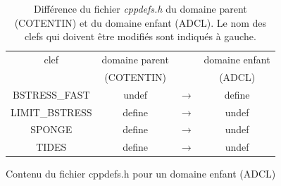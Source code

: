 \documentclass[10pt,a4paper,titlepage]{article}
\begin{document}
\begin{table}[h!]
    \centering
    \caption{
        Différence du fichier \textit{cppdefs.h} du domaine parent (COTENTIN) et du domaine enfant (ADCL).
        Le nom des clefs qui doivent être modifiés sont indiqués à gauche.
    }
    \begin{tabular}{c | c c c}
        clef & domaine parent & & domaine enfant  \\
         & (COTENTIN) & & (ADCL) \\
        \hline
        BSTRESS\_FAST & {\color{red}undef} & $\rightarrow$ & {\color{green}define} \\
        \hline
        LIMIT\_BSTRESS & {\color{green}define} & $\rightarrow$ & {\color{red}undef} \\
        \hline
        SPONGE & {\color{green}define} & $\rightarrow$ & {\color{red}undef} \\
        \hline
        TIDES & {\color{green}define} & $\rightarrow$ & {\color{red}undef} \\
    \end{tabular}
    
    \label{table:cppdefs_mere}
\end{table}

\begin{codeEnv}{{Contenu du fichier cppdefs.h pour un domaine enfant (ADCL)\label{codecppdefs}}}
    
\end{codeEnv}
\end{document}
